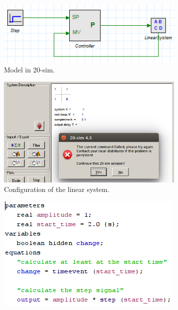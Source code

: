 \documentclass[a4paper,twoside,11pt]{article}
\begin{document}
\begin{figure}
	\centering
	\begin{subfigure}{0.5\textwidth}
	 \centering
	 \includegraphics[width=\textwidth]{./images/3_1-20sim-model.png}
	 \caption{Model in 20-sim.}
	 \label{fig:3_1-20sim-model:model}
	\end{subfigure}%
	\begin{subfigure}{0.5\textwidth}
	 \centering
	 \includegraphics[width=\textwidth]{./images/3_1-20sim-plant.png}
	 \caption{Configuration of the linear system.}
	 \label{fig:3_1-20sim-model:plant}
	\end{subfigure}
	\begin{subfigure}{0.5\textwidth}
	 \centering
	 \includegraphics[width=\textwidth]{./images/3_1-20sim-model-stepfunction.png}

\end{subfigure}
\end{figure}
\end{document}
